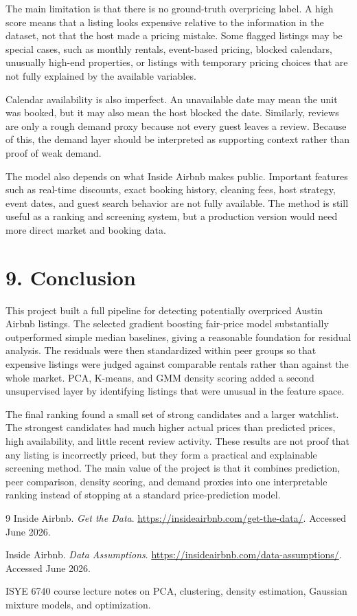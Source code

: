 \documentclass[11pt]{article}
\begin{document}
The main limitation is that there is no ground-truth overpricing label. A high score means that a listing looks expensive relative to the information in the dataset, not that the host made a pricing mistake. Some flagged listings may be special cases, such as monthly rentals, event-based pricing, blocked calendars, unusually high-end properties, or listings with temporary pricing choices that are not fully explained by the available variables.

Calendar availability is also imperfect. An unavailable date may mean the unit was booked, but it may also mean the host blocked the date. Similarly, reviews are only a rough demand proxy because not every guest leaves a review. Because of this, the demand layer should be interpreted as supporting context rather than proof of weak demand.

The model also depends on what Inside Airbnb makes public. Important features such as real-time discounts, exact booking history, cleaning fees, host strategy, event dates, and guest search behavior are not fully available. The method is still useful as a ranking and screening system, but a production version would need more direct market and booking data.

\section*{9. Conclusion}

This project built a full pipeline for detecting potentially overpriced Austin Airbnb listings. The selected gradient boosting fair-price model substantially outperformed simple median baselines, giving a reasonable foundation for residual analysis. The residuals were then standardized within peer groups so that expensive listings were judged against comparable rentals rather than against the whole market. PCA, K-means, and GMM density scoring added a second unsupervised layer by identifying listings that were unusual in the feature space.

The final ranking found a small set of strong candidates and a larger watchlist. The strongest candidates had much higher actual prices than predicted prices, high availability, and little recent review activity. These results are not proof that any listing is incorrectly priced, but they form a practical and explainable screening method. The main value of the project is that it combines prediction, peer comparison, density scoring, and demand proxies into one interpretable ranking instead of stopping at a standard price-prediction model.

\begin{thebibliography}{9}
Inside Airbnb. \textit{Get the Data}. \url{https://insideairbnb.com/get-the-data/}. Accessed June 2026.

Inside Airbnb. \textit{Data Assumptions}. \url{https://insideairbnb.com/data-assumptions/}. Accessed June 2026.

ISYE 6740 course lecture notes on PCA, clustering, density estimation, Gaussian mixture models, and optimization.
\end{thebibliography}
\end{document}
